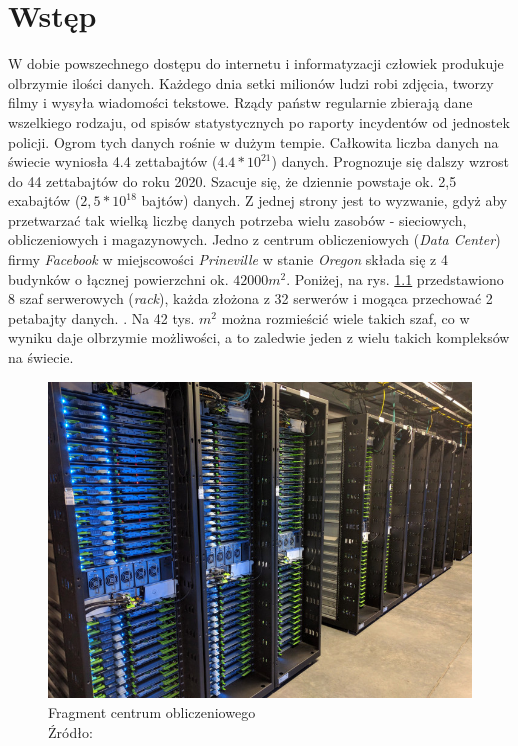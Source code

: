 \chapter{Wstęp}
W dobie powszechnego dostępu do internetu i informatyzacji człowiek produkuje olbrzymie ilości danych.
Każdego dnia setki milionów ludzi robi zdjęcia, tworzy filmy i wysyła wiadomości tekstowe.
Rządy państw regularnie zbierają dane wszelkiego rodzaju, od spisów statystycznych po raporty incydentów od jednostek policji.
Ogrom tych danych rośnie w dużym tempie.
Całkowita liczba danych na świecie wyniosła 4.4 zettabajtów ($4.4 * 10^{21}$) danych.
Prognozuje się dalszy wzrost do 44 zettabajtów do roku 2020.
Szacuje się, że dziennie powstaje ok. 2,5 exabajtów ($2,5 * 10^{18}$ bajtów) danych. \cite{khoso2016}
Z jednej strony jest to wyzwanie, gdyż aby przetwarzać tak wielką liczbę danych potrzeba wielu zasobów - sieciowych, obliczeniowych i magazynowych.
Jedno z centrum obliczeniowych (\textit{Data Center}) firmy \textit{Facebook} w miejscowości \textit{Prineville} w stanie \textit{Oregon} składa się z 4 budynków o łącznej powierzchni ok. $42000 m^2$.
Poniżej, na rys. \ref{fig:data_center} przedstawiono 8 szaf serwerowych (\textit{rack}), każda złożona z 32 serwerów i mogąca przechować 2 petabajty danych. \cite{lardinois2016}.
Na 42 tys. $m^2$ można rozmieścić wiele takich szaf, co w wyniku daje olbrzymie możliwości, a to zaledwie jeden z wielu takich kompleksów na świecie.

\begin{figure}[h!tb]
	 \centering
	 \includegraphics[width = 1.0\linewidth]{img/data_center}
	 \caption{Fragment centrum obliczeniowego \\
              Źródło: \cite{lardinois2016}}
	 \label{fig:data_center}
\end{figure}

